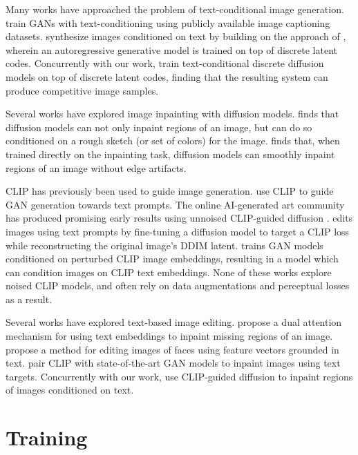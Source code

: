 \documentclass{article}
\begin{document}
Many works have approached the problem of text-conditional image generation. \citet{attngan,dmgan,dfgan,xmcgan,textcl} train GANs with text-conditioning using publicly available image captioning datasets. \citet{dalle} synthesize images conditioned on text by building on the approach of \citet{vqvae}, wherein an autoregressive generative model is trained on top of discrete latent codes. Concurrently with our work, \citet{vqdiff} train text-conditional discrete diffusion models on top of discrete latent codes, finding that the resulting system can produce competitive image samples.

Several works have explored image inpainting with diffusion models. \citet{sdedit} finds that diffusion models can not only inpaint regions of an image, but can do so conditioned on a rough sketch (or set of colors) for the image. \citet{palette} finds that, when trained directly on the inpainting task, diffusion models can smoothly inpaint regions of an image without edge artifacts.

CLIP has previously been used to guide image generation. \citet{clipglass,styleclip,bigsleep,stylegannada} use CLIP to guide GAN generation towards text prompts. The online AI-generated art community has produced promising early results using unnoised CLIP-guided diffusion \citep{clipdiff,secondarymodelmethod}. \citet{diffusionclip} edits images using text prompts by fine-tuning a diffusion model to target a CLIP loss while reconstructing the original image's DDIM \citep{ddim} latent. \mbox{\citet{lafite}} trains GAN models conditioned on perturbed CLIP image embeddings, resulting in a model which can condition images on CLIP text embeddings. None of these works explore noised CLIP models, and often rely on data augmentations and perceptual losses as a result.

Several works have explored text-based image editing. \citet{textinpainting} propose a dual attention mechanism for using text embeddings to inpaint missing regions of an image. \citet{textstylegan} propose a method for editing images of faces using feature vectors grounded in text. \citet{paintbyword} pair CLIP with state-of-the-art GAN models to inpaint images using text targets. Concurrently with our work, \citet{blendeddiff} use CLIP-guided diffusion to inpaint regions of images conditioned on text.

\section{Training}
\end{document}
